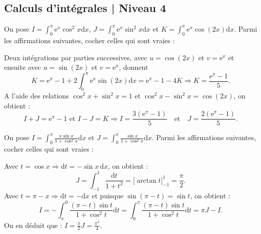 \subsection{Calculs d'intégrales | Niveau 4}


\begin{question}
On pose $\displaystyle I=\int _0^{\pi}\mathrm{e}^x\cos ^2x\mathrm{d}x$, $\displaystyle J=\int _0^{\pi}\mathrm{e}^x\sin ^2x\mathrm{d}x$ et $\displaystyle K=\int _0^{\pi}\mathrm{e}^x\cos (2x)\mathrm{d}x$. Parmi les affirmations suivantes, cocher celles qui sont vraies :
\begin{answers}  
\end{answers}
\vskip2mm
\begin{explanations}
Deux intégrations par parties successives, avec $u=\cos (2x)$ et $v=\mathrm{e}^x$ et ensuite avec $u=\sin (2x)$ et $v=\mathrm{e}^x$, donnent
$$K=\mathrm{e}^{\pi}-1+2\int _0^{\pi} \mathrm{e}^x\sin (2x)\mathrm{d}x=\mathrm{e}^{\pi}-1-4K\Rightarrow K=\frac{\mathrm{e}^{\pi}-1}{5}.$$
A l'aide des relations $\cos ^2x+\sin ^2x=1$ et  $\cos ^2x-\sin ^2x=\cos (2x)$, on obtient :
$$I+J=\mathrm{e}^{\pi}-1\mbox{ et }I-J=K\Rightarrow I=\frac{3(\mathrm{e}^{\pi}-1)}{5}\quad \mbox{et}\quad J=\frac{2(\mathrm{e}^{\pi}-1)}{5}.$$
\end{explanations}
\end{question}

\begin{question}
On pose $\displaystyle I=\int _0^{\pi}\frac{x\sin x}{1+\cos ^2x}\mathrm{d}x$ et $\displaystyle J=\int _0^{\pi}\frac{\sin x}{1+\cos ^2x}\mathrm{d}x$. Parmi les affirmations suivantes, cocher celles qui sont vraies :
\begin{answers}
\end{answers}
\vskip2mm
\begin{explanations}
Avec $t=\cos x\Rightarrow \mathrm{d}t=-\sin x\, \mathrm{d}x$, on obtient : 
$$J=\int _{-1}^1\frac{\mathrm{d}t}{1+t^2}=\Big[\arctan t\Big]_{-1}^1=\frac{\pi}{2}.$$
Avec $t=\pi -x\Rightarrow \mathrm{d}t=-\mathrm{d}x$ et puisque $\sin (\pi -t)=\sin t$, on obtient : 
$$I=-\int _{\pi}^0\frac{(\pi -t)\sin t}{1+\cos ^2t}\mathrm{d}t=\int _0^{\pi}\frac{(\pi -t)\sin t}{1+\cos ^2t}\mathrm{d}t=\pi J-I.$$
On en déduit que : $\displaystyle I=\frac{\pi }{2}J=\frac{\pi ^2}{4}$.
\end{explanations}
\end{question}

